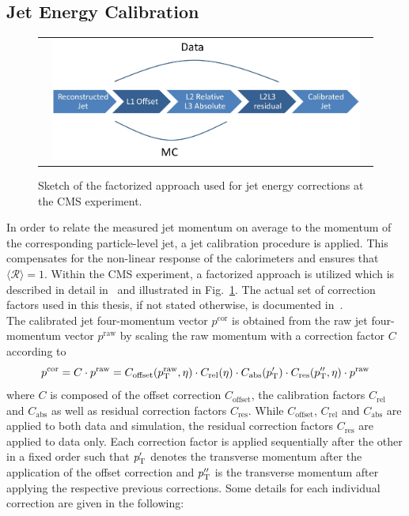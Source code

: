 \subsection{Jet Energy Calibration}
\label{subsec:jets_calib} 
\begin{figure}[!t]
  \centering 
  \begin{tabular}{c}
    \includegraphics[width=0.95\textwidth]{figures/JEC.jpg} 
  \end{tabular}
  \caption{Sketch of the factorized approach used for jet energy corrections at the CMS experiment.}
  \label{fig:jec_sketch}
\end{figure}
In order to relate the measured jet momentum on average to the momentum of the corresponding particle-level jet, a jet calibration procedure is applied. This compensates for the non-linear response of the calorimeters and ensures that $\langle \mathcal{R} \rangle = 1$. Within the CMS experiment, a factorized approach is utilized which is described in detail in~\cite{1748-0221-6-11-P11002} and illustrated in Fig.~\ref{fig:jec_sketch}. The actual set of correction factors used in this thesis, if not stated otherwise, is documented in~\cite{CMS-DP-2013-033}. \\
The calibrated jet four-momentum vector $p^\mathrm{cor}$ is obtained from the raw jet four-momentum vector $p^\mathrm{raw}$ by scaling the raw momentum with a correction factor $C$ according to
\begin{equation}
p^\mathrm{cor} = C \cdot p^\mathrm{raw} = C_{\mathrm{offset}}(p_{\text{T}}^\mathrm{raw}, \eta) \cdot C_{\mathrm{rel}}(\eta) \cdot C_{\mathrm{abs}}(p_{\text{T}}') \cdot C_\mathrm{res}(p_{\text{T}}'', \eta) \cdot p^\mathrm{raw}
\end{equation} 
 where $C$ is composed of the offset correction $C_{\mathrm{offset}}$, the calibration factors $C_{\mathrm{rel}}$ and $C_{\mathrm{abs}}$ as well as residual correction factors $C_{\mathrm{res}}$. While $C_{\mathrm{offset}}$, $C_{\mathrm{rel}}$ and $C_{\mathrm{abs}}$ are applied to both data and simulation, the residual correction factors $C_{\mathrm{res}}$ are applied to data only. Each correction factor is applied sequentially after the other in a fixed order such that $p_{\text{T}}'$ denotes the transverse momentum after the application of the offset correction and $p_{\text{T}}''$ is the transverse momentum after applying the respective previous corrections. Some details for each individual correction are given in the following: 
